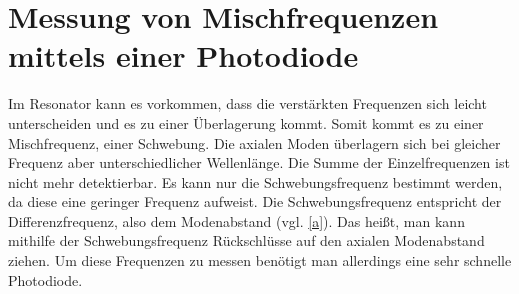 \section{Messung von Mischfrequenzen mittels einer Photodiode}
Im Resonator kann es vorkommen, dass die verstärkten Frequenzen sich leicht unterscheiden und es zu einer Überlagerung kommt.
Somit kommt es zu einer Mischfrequenz, einer Schwebung. Die axialen Moden überlagern sich 
bei gleicher Frequenz aber unterschiedlicher Wellenlänge. 
Die Summe der Einzelfrequenzen ist nicht mehr detektierbar. Es kann nur die Schwebungsfrequenz bestimmt werden, da diese eine geringer Frequenz aufweist. Die Schwebungsfrequenz entspricht der Differenzfrequenz, also dem Modenabstand (vgl. \eqref{a}). Das heißt, man kann mithilfe der Schwebungsfrequenz Rückschlüsse auf den axialen Modenabstand ziehen.
Um diese Frequenzen zu messen benötigt man allerdings eine sehr schnelle Photodiode.
